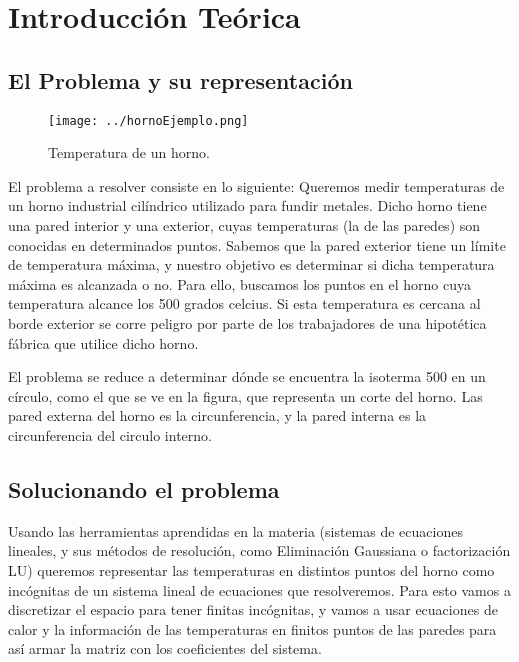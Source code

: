 \section{Introducción Teórica}

\subsection{El Problema y su representación}


\begin{wrapfigure}{r}{0.5\textwidth}
  \vspace{-20pt}
  \begin{center}
    \texttt{[image: ../hornoEjemplo.png]}
  \end{center}
  \vspace{-20pt}
  \caption{Temperatura de un horno.}
  \vspace{-10pt}
  \label{fig:corteHorno}
\end{wrapfigure}

El problema a resolver consiste en lo siguiente: Queremos medir temperaturas de un horno industrial cilíndrico utilizado para fundir metales. Dicho horno tiene una pared interior y una exterior, cuyas temperaturas (la de las paredes) son conocidas en determinados puntos. Sabemos que la pared exterior tiene un límite de temperatura máxima, y nuestro objetivo es determinar si dicha temperatura máxima es alcanzada o no. Para ello, buscamos los puntos en el horno cuya temperatura alcance los 500 grados celcius.  Si esta temperatura es cercana al borde exterior se corre peligro por parte de los trabajadores de una hipotética fábrica que utilice dicho horno.




El problema se reduce a determinar dónde se encuentra la isoterma 500 en un círculo, como el que se ve en la figura, que representa un corte del horno. Las pared externa del horno es la circunferencia, y la pared interna es la circunferencia del circulo interno.



\subsection{Solucionando el problema}

Usando las herramientas aprendidas en la materia (sistemas de ecuaciones lineales, y sus métodos de resolución, como Eliminación Gaussiana o factorización LU) queremos representar las temperaturas en distintos puntos del horno como incógnitas de un sistema lineal de ecuaciones que resolveremos.
 Para esto vamos a discretizar el espacio para tener finitas incógnitas, y vamos a usar ecuaciones de calor y la información de las temperaturas en finitos puntos de las paredes para así armar la matriz con los coeficientes del sistema.\\



